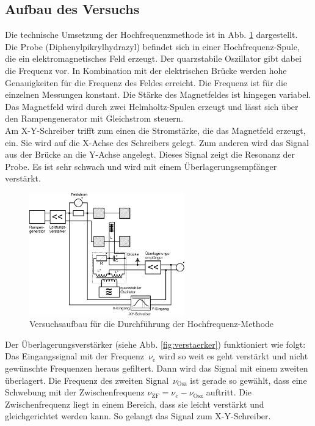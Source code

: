 \subsection{Aufbau des Versuchs}
Die technische Umsetzung der Hochfrequenzmethode ist in Abb. \ref{fig:aufbau} dargestellt. Die Probe (Diphenylpikrylhydrazyl) befindet sich in einer Hochfrequenz-Spule, die ein elektromagnetisches Feld erzeugt. Der quarzstabile Oszillator gibt dabei die Frequenz vor. In Kombination mit der elektrischen Brücke werden hohe Genauigkeiten für die Frequenz des Feldes erreicht. Die Frequenz ist für die einzelnen Messungen konstant. Die Stärke des Magnetfeldes ist hingegen variabel. Das Magnetfeld wird durch zwei Helmholtz-Spulen erzeugt und lässt sich über den Rampengenerator mit Gleichstrom steuern. \\
Am X-Y-Schreiber trifft zum einen die Stromstärke, die das Magnetfeld erzeugt, ein. Sie wird auf die X-Achse des Schreibers gelegt.  Zum anderen wird das Signal aus der Brücke an die Y-Achse angelegt. Dieses Signal zeigt die Resonanz der Probe. Es ist sehr schwach und wird mit einem Überlagerungsempfänger verstärkt.
\\
 \begin{figure}[h!]
	\centering
	\includegraphics[width=0.6\textwidth]{Anleitung_Abb8.pdf}
	\caption[Versuchsaufbau]{Versuchsaufbau für die Durchführung der Hochfrequenz-Methode \cite{V28}}
	\label{fig:aufbau}
\end{figure}
Der Überlagerungsverstärker (siehe Abb. \ref{fig:verstaerker}) funktioniert wie folgt: Das Eingangssignal mit der Frequenz~$\nu_e$ wird so weit es geht verstärkt und nicht gewünschte Frequenzen  heraus gefiltert. Dann wird das Signal mit einem zweiten überlagert. Die Frequenz des zweiten Signal~$\nu_\textrm{Osz}$ ist gerade so gewählt, dass eine Schwebung mit der Zwischenfrequenz $\nu_\textrm{ZF} = \nu_e - \nu_\textrm{Osz}$ auftritt. Die Zwischenfrequenz liegt in einem Bereich, dass sie leicht verstärkt und gleichgerichtet werden kann. So gelangt das Signal zum X-Y-Schreiber.
\\


